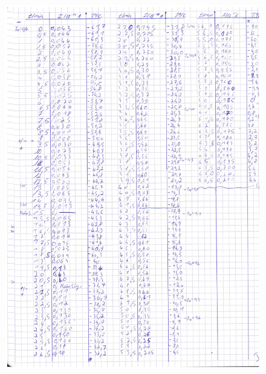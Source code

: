 \begin{figure}[htb]
  \centering
  \includegraphics[height=\textheight]{data/Messdaten3.pdf}
\end{figure}


